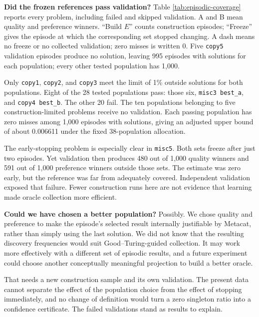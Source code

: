 \documentclass[10pt,letterpaper]{article}
\begin{document}
\textbf{Did the frozen references pass validation?} Table \ref{tab:episodic-coverage}
reports every problem, including failed and skipped validation. A and B mean quality and
preference winners. ``Build \(E\)'' counts construction episodes; ``Freeze'' gives the
episode at which the corresponding set stopped changing. A dash means no freeze or no
collected validation; zero misses is written 0. Five \texttt{copy5} validation episodes
produce no solution, leaving 995 episodes with solutions for each population; every other
tested population has 1,000.



Only \texttt{copy1}, \texttt{copy2}, and \texttt{copy3} meet the limit of 1\% outside
solutions for both populations. Eight of the 28 tested populations pass: those six,
\texttt{misc3\ best\_a}, and \texttt{copy4\ best\_b}. The other 20 fail. The ten
populations belonging to five construction-limited problems receive no validation. Each
passing population has zero misses among 1,000 episodes with solutions, giving an adjusted
upper bound of about 0.006611 under the fixed 38-population allocation.

The early-stopping problem is especially clear in \texttt{misc5}. Both sets freeze after
just two episodes. Yet validation then produces 480 out of 1,000 quality winners and 591
out of 1,000 preference winners outside those sets. The estimate was zero early, but the
reference was far from adequately covered. Independent validation exposed that failure.
Fewer construction runs here are not evidence that learning made oracle collection more
efficient.

\textbf{Could we have chosen a better population?} Possibly. We chose quality and
preference to make the episode's selected result internally justifiable by Metacat, rather
than simply using the last solution. We did not know that the resulting discovery
frequencies would suit Good--Turing-guided collection. It may work more effectively with a
different set of episodic results, and a future experiment could choose another
conceptually meaningful projection to build a better oracle.

That needs a new construction sample and its own validation. The present data cannot
separate the effect of the population choice from the effect of stopping immediately, and
no change of definition would turn a zero singleton ratio into a confidence certificate.
The failed validations stand as results to explain.
\end{document}
